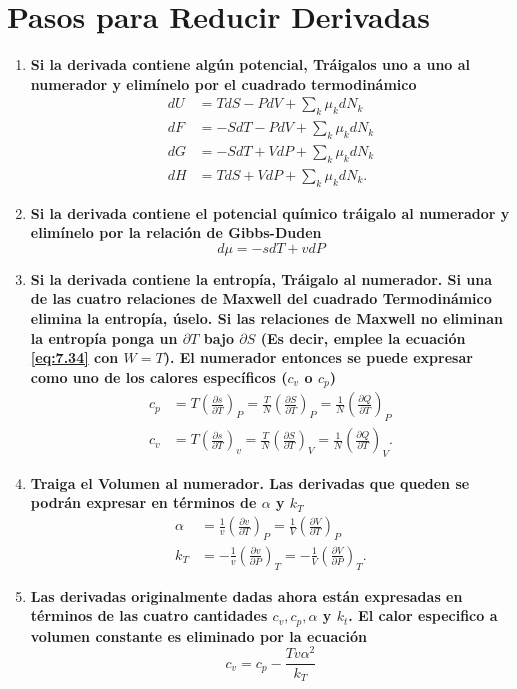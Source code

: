 \documentclass[12pt]{exam}
\begin{document}
\section{Pasos para Reducir Derivadas}
\begin{enumerate}
  \item \textbf{Si la derivada contiene algún potencial, Tráigalos uno a uno al numerador y elimínelo por el cuadrado termodinámico}
    \begin{align}
      dU &= TdS - PdV + \sum_k \mu_k dN_k \\
      dF &= -SdT - PdV + \sum_k \mu_k dN_k \\
      dG &= -SdT + VdP + \sum_k \mu_k dN_k \\
      dH &= TdS + VdP + \sum_k \mu_k dN_k
    .\end{align}
  \item \textbf{Si la derivada contiene el potencial químico tráigalo al numerador y elimínelo por la relación de Gibbs-Duden} 
    \begin{equation}
      \label{eq:GibbsDuhem}
      d\mu = -sdT + vdP
    \end{equation}
  \item \textbf{Si la derivada contiene la entropía, Tráigalo al numerador. Si una de las cuatro relaciones de Maxwell del cuadrado Termodinámico elimina la entropía, úselo. Si las relaciones de Maxwell no eliminan la entropía ponga un $\partial T$ bajo  $\partial S$ (Es decir, emplee la ecuación \ref{eq:7.34} con $W = T$). El numerador entonces se puede expresar como uno de los calores específicos ($c_v$ o  $c_p$) }
    \begin{align}
     c_p &= T\left( \frac{\partial s}{\partial T}  \right)_P = \frac{T}{N}\left( \frac{\partial S}{\partial T}  \right)_P = \frac{1}{N}\left( \frac{\partial Q}{\partial T}  \right)_P \\ 
     c_v &= T\left( \frac{\partial s}{\partial T}  \right)_v = \frac{T}{N}\left( \frac{\partial S}{\partial T}  \right)_V = \frac{1}{N}\left( \frac{\partial Q}{\partial T}  \right)_V 
    .\end{align}
  \item \textbf{Traiga el Volumen al numerador. Las derivadas que queden se podrán expresar en términos de $\alpha$ y  $k_T$}
    \begin{align}
      \alpha &= \frac{1}{v}\left( \frac{\partial v}{\partial T}  \right)_P = \frac{1}{V}\left( \frac{\partial V}{\partial T}  \right)_P \\
      k_T &= -\frac{1}{v}\left( \frac{\partial v}{\partial P}  \right)_T = -\frac{1}{V}\left( \frac{\partial V}{\partial P}  \right)_T
    .\end{align}
   \item \textbf{Las derivadas originalmente dadas ahora están expresadas en términos de las cuatro cantidades $c_v,c_p,\alpha$ y  $k_t$. El calor especifico a volumen constante es eliminado por la ecuación}
     \begin{equation}
       \label{eq:cvcp}
       c_v = c_p -  \frac{Tv\alpha^2}{k_T}
     \end{equation}
\end{enumerate}
\end{document}
